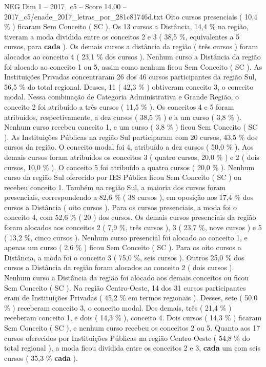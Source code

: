 \begin{textsample}{NEG Dim 1 – 2017\_c5 – Score 14.00 – 2017\_c5/enade\_2017\_letras\_por\_281c81746d.txt}
Oito cursos presenciais ( 10,4 \% ) ficaram Sem Conceito ( SC ).
Os 13 cursos a Distância, 14,4 \% na região, tiveram a moda dividida entre os conceitos 2 e 3 ( 38,5 \%, equivalentes a 5 cursos, para \textbf{cada} ).
Os demais cursos a distância da região ( três cursos ) foram alocados ao conceito 4 ( 23,1 \% dos cursos ).
Nenhum curso a Distância da região foi alocado ao conceito 1 ou 5, assim como nenhum ficou Sem Conceito ( SC ).
As Instituições Privadas concentraram 26 dos 46 cursos participantes da região Sul, 56,5 \% do total regional.
Desses, 11 ( 42,3 \% ) obtiveram conceito 3, o conceito modal.
Nessa combinação de Categoria Administrativa e Grande Região, o conceito 2 foi atribuído a três cursos ( 11,5 \% ).
Os conceitos 4 e 5 foram atribuídos, respectivamente, a dez cursos ( 38,5 \% ) e a um curso ( 3,8 \% ).
Nenhum curso recebeu conceito 1, e um curso ( 3,8 \% ) ficou Sem Conceito ( SC ).
As Instituições Públicas na região Sul participaram com 20 cursos, 43,5 \% dos cursos da região.
O conceito modal foi 4, atribuído a dez cursos ( 50,0 \% ).
Aos demais cursos foram atribuídos os conceitos 3 ( quatro cursos, 20,0 \% ) e 2 ( dois cursos, 10,0 \% ).
O conceito 5 foi atribuído a quatro cursos ( 20,0 \% ).
Nenhum curso da região Sul oferecido por IES Pública ficou Sem Conceito ( SC ) ou recebeu conceito 1.
Também na região Sul, a maioria dos cursos foram presenciais, correspondendo a 82,6 \% ( 38 cursos ), em oposição aos 17,4 \% dos cursos a Distância ( oito cursos ).
Para os cursos presenciais, a moda foi o conceito 4, com 52,6 \% ( 20 ) dos cursos.
Os demais cursos presenciais da região foram alocados aos conceitos 2 ( 7,9 \%, três cursos ), 3 ( 23,7 \%, nove cursos ) e 5 ( 13,2 \%, cinco cursos ).
Nenhum curso presencial foi alocado ao conceito 1, e apenas um curso ( 2,6 \% ) ficou Sem Conceito ( SC ).
Para os oito cursos a Distância, a moda foi o conceito 3 ( 75,0 \%, seis cursos ).
Outros 25,0 \% dos cursos a Distância da região foram alocados ao conceito 2 ( dois cursos ).
Nenhum curso a Distância da região foi alocado aos demais conceitos ou ficou Sem Conceito ( SC ).
Na região Centro-Oeste, 14 dos 31 cursos participantes eram de Instituições Privadas ( 45,2 \% em termos regionais ).
Desses, sete ( 50,0 \% ) receberam conceito 3, o conceito modal.
Dos demais, três ( 21,4 \% ) receberam conceito 1, e dois ( 14,3 \% ), conceito 4.
Dois cursos ( 14,3 \% ) ficaram Sem Conceito ( SC ), e nenhum curso recebeu os conceitos 2 ou 5.
Quanto aos 17 cursos oferecidos por Instituições Públicas na região Centro-Oeste ( 54,8 \% do total regional ), a moda ficou dividida entre os conceitos 2 e 3, \textbf{cada} um com seis cursos ( 35,3 \% \textbf{cada} ).

\end{textsample}
